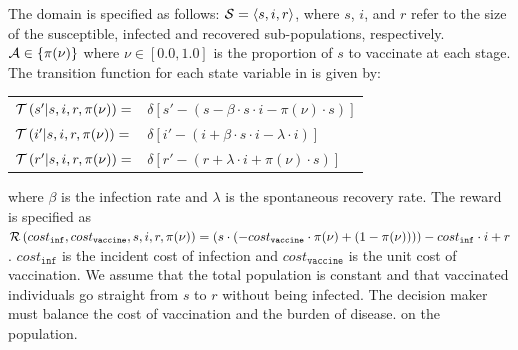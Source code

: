 The domain is specified as follows: {\footnotesize $ \mathcal{S} = \left\langle s, i, r \right\rangle$}, where $ s $, $ i $, and $ r $ refer to the size of the susceptible, infected and recovered sub-populations, respectively. {\footnotesize $ \mathcal{A} \in \left\lbrace \pi(\nu) \right\rbrace $} where {\footnotesize $\nu \in \left[0.0, 1.0\right]$} is the proportion of $ s $ to vaccinate at each stage. The transition function {\footnotesize \Transition} for each state variable in {\footnotesize \State} is given by:
    {\footnotesize 
        \abovedisplayskip=5pt
        \belowdisplayskip=0pt
        \renewcommand{\arraystretch}{1.5}
        \begin{tabular}{ll}
            $ \mathcal{T}\left( s' | s, i, r, \pi(\nu) \right) =$ & $ \delta \left[ s' - (s - \beta \cdot s \cdot i - \pi(\nu) \cdot s) \right] $ \\
            $ \mathcal{T}\left( i' | s, i, r, \pi(\nu) \right) =$ & $ \delta \left[ i' - (i + \beta \cdot s \cdot i - \lambda \cdot i) \right] $ \\
            $ \mathcal{T}\left( r' | s, i, r, \pi(\nu) \right) =$ & $ \delta \left[ r' - (r + \lambda \cdot i + \pi(\nu) \cdot s) \right] $ \\            
        \end{tabular}
    }%
where {\footnotesize $ \beta $} is the infection rate and {\footnotesize $\lambda$} is the spontaneous recovery rate. The reward is specified as {\footnotesize $ \mathcal{R}\left(cost_{\mathtt{inf}}, cost_{\mathtt{vaccine}}, s, i, r, \pi(\nu) \right) = (s \cdot (-cost_{\mathtt{vaccine}} \cdot \pi(\nu) + (1 - \pi(\nu)))) - cost_{\mathtt{inf}} \cdot i + r$}. {\footnotesize $ cost_{\mathtt{inf}} $} is the incident cost of infection
and {\footnotesize $ cost_{\mathtt{vaccine}} $} is the unit cost of vaccination. We assume that the total population is constant and that vaccinated individuals go straight from {\footnotesize $ s $} to {\footnotesize $ r $} without being infected. The decision maker must balance the cost of vaccination and the burden of disease.
on the population. 

